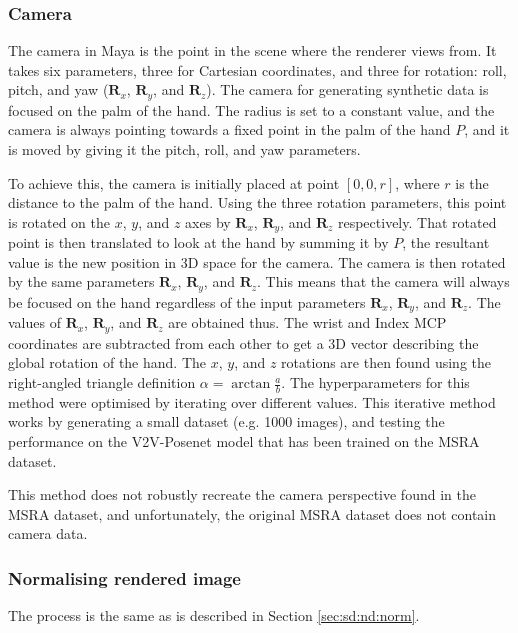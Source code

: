 \subsubsection{Camera}
\label{sec:sd:d:cam}
The camera in Maya is the point in the scene where the renderer views from. It takes six parameters, three for Cartesian coordinates, and three for rotation: roll, pitch, and yaw ($\bm{R}_x$, $\bm{R}_y$, and $\bm{R}_z$). The camera for generating synthetic data is focused on the palm of the hand. The radius is set to a constant value, and the camera is always pointing towards a fixed point in the palm of the hand $P$, and it is moved by giving it the pitch, roll, and yaw parameters.

To achieve this, the camera is initially placed at point $[0, 0, r]$, where $r$ is the distance to the palm of the hand. Using the three rotation parameters, this point is rotated on the $x$, $y$, and $z$ axes by $\bm{R}_x$, $\bm{R}_y$, and $\bm{R}_z$ respectively. That rotated point is then translated to look at the hand by summing it by $P$, the resultant value is the new position in 3D space for the camera. The camera is then rotated by the same parameters $\bm{R}_x$, $\bm{R}_y$, and $\bm{R}_z$. This means that the camera will always be focused on the hand regardless of the input parameters $\bm{R}_x$, $\bm{R}_y$, and $\bm{R}_z$. The values of $\bm{R}_x$, $\bm{R}_y$, and $\bm{R}_z$ are obtained thus. The wrist and Index MCP coordinates are subtracted from each other to get a 3D vector describing the global rotation of the hand. The $x$, $y$, and $z$ rotations are then found using the right-angled triangle definition $\alpha=\arctan{\frac{a}{b}}$. The hyperparameters for this method were optimised by iterating over different values. This iterative method works by generating a small dataset (e.g. 1000 images), and testing the performance on the V2V-Posenet model that has been trained on the MSRA dataset.

This method does not robustly recreate the camera perspective found in the MSRA dataset, and unfortunately, the original MSRA dataset does not contain camera data.

\subsubsection{Normalising rendered image}
The process is the same as is described in Section \ref{sec:sd:nd:norm}.

